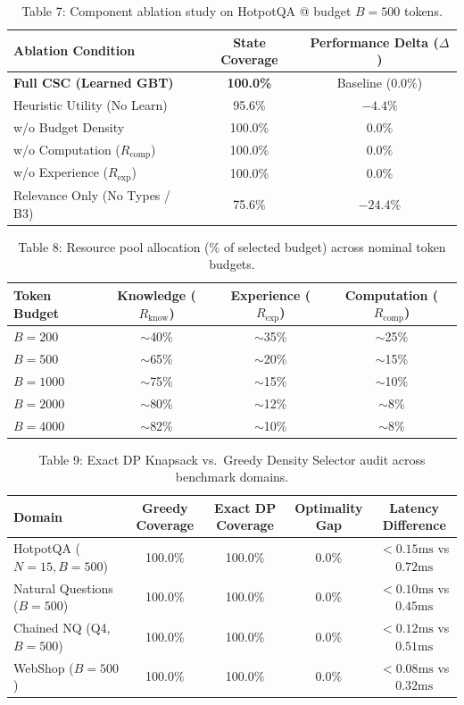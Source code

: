 \documentclass{article}
\begin{document}
\begin{table}[h]
\caption{Table 7: Component ablation study on HotpotQA @ budget $B=500$ tokens.}
\centering
\begin{tabular}{lcc}
\toprule
Ablation Condition & State Coverage & Performance Delta ($\Delta$) \\
\midrule
\textbf{Full CSC (Learned GBT)} & \textbf{100.0\%} & Baseline ($0.0\%$) \\
Heuristic Utility (No Learn) & 95.6\% & $-4.4\%$ \\
w/o Budget Density & 100.0\% & $0.0\%$ \\
w/o Computation ($R_{\text{comp}}$) & 100.0\% & $0.0\%$ \\
w/o Experience ($R_{\text{exp}}$) & 100.0\% & $0.0\%$ \\
Relevance Only (No Types / B3) & 75.6\% & $\mathbf{-24.4\%}$ \\
\bottomrule
\end{tabular}
\end{table}

\begin{table}[h]
\caption{Table 8: Resource pool allocation (\% of selected budget) across nominal token budgets.}
\centering
\begin{tabular}{lccc}
\toprule
Token Budget & Knowledge ($R_{\text{know}}$) & Experience ($R_{\text{exp}}$) & Computation ($R_{\text{comp}}$) \\
\midrule
$B = 200$ & $\sim$40\% & $\sim$35\% & $\sim$25\% \\
$B = 500$ & $\sim$65\% & $\sim$20\% & $\sim$15\% \\
$B = 1000$ & $\sim$75\% & $\sim$15\% & $\sim$10\% \\
$B = 2000$ & $\sim$80\% & $\sim$12\% & $\sim$8\% \\
$B = 4000$ & $\sim$82\% & $\sim$10\% & $\sim$8\% \\
\bottomrule
\end{tabular}
\end{table}

\begin{table}[h]
\caption{Table 9: Exact DP Knapsack vs.\ Greedy Density Selector audit across benchmark domains.}
\centering
\begin{tabular}{lcccc}
\toprule
Domain & Greedy Coverage & Exact DP Coverage & Optimality Gap & Latency Difference \\
\midrule
HotpotQA ($N{=}15, B{=}500$) & 100.0\% & 100.0\% & 0.0\% & $< 0.15\text{ms}$ vs $0.72\text{ms}$ \\
Natural Questions ($B{=}500$) & 100.0\% & 100.0\% & 0.0\% & $< 0.10\text{ms}$ vs $0.45\text{ms}$ \\
Chained NQ (Q4, $B{=}500$) & 100.0\% & 100.0\% & 0.0\% & $< 0.12\text{ms}$ vs $0.51\text{ms}$ \\
WebShop ($B{=}500$) & 100.0\% & 100.0\% & 0.0\% & $< 0.08\text{ms}$ vs $0.32\text{ms}$ \\
\bottomrule
\end{tabular}
\end{table}

\clearpage

\end{document}

